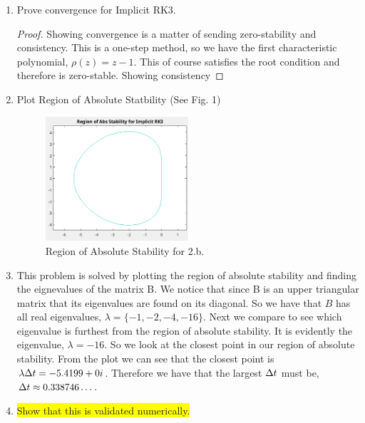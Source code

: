 \documentclass{article}
\begin{document}
\begin{enumerate}[label=\alph*)]

    \item Prove convergence for Implicit RK3.
    \begin{proof}
        Showing convergence is a matter of sending zero-stability and
        consistency. This is a one-step method, so we have the first
        characteristic polynomial, $\rho(z) = z - 1$. This of course satisfies
        the root condition and therefore is zero-stable. Showing consistency 
    \end{proof}

    \item Plot Region of Absolute Statbility (See Fig. 1)
    \begin{figure}[ht]
        \centering 
        \includegraphics[width=0.5\textwidth]{2.b.AbsStab'.png}
        \caption{Region of Absolute Stability for 2.b.}
    \end{figure}

    \item  
    This problem is solved by plotting the region of absolute stability and
    finding the eignevalues of the matrix B. We notice that since B is an upper
    triangular matrix that its eigenvalues are found on its diagonal. So we have
    that $B$ has all real eigenvalues, $\lambda = \{-1, -2, -4, -16\}$. Next we
    compare to see which eigenvalue is furthest from the region of absolute
    stability. It is evidently the eigenvalue, $\lambda = -16$. So we look at
    the closest point in our region of absolute stability. From the plot we can
    see that the closest point is $\lambda\Delta t = -5.4199 + 0i$. Therefore we
    have that the largest $\Delta t$ must be, $\Delta t \approx 0.338746\ldots$. 

    \item \colorbox{yellow}{Show that this is validated numerically. }

\end{enumerate}
\end{document}
